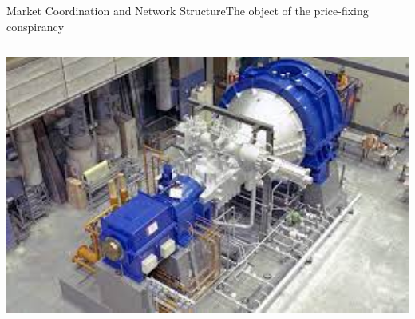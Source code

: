 \documentclass[aspectratio=1610]{beamer}
\begin{document}
\begin{frame}{Market Coordination and Network Structure}{The object of the price-fixing conspirancy}
\begin{columns}
\begin{column}{0.33\textwidth}
			\includegraphics[width=1\textwidth]{images/turbine_generator}
		\end{column}
	\end{columns}
\end{frame}
\end{document}
